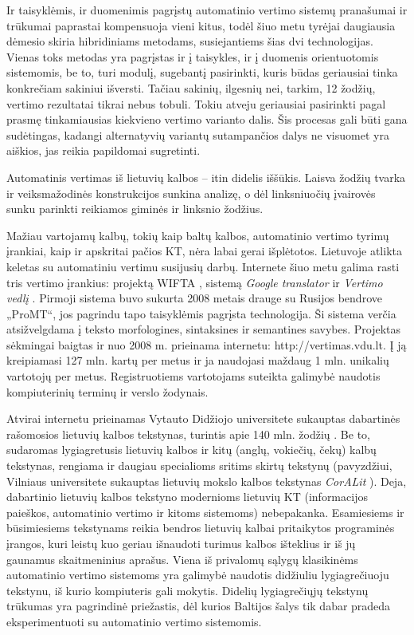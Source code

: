 \documentclass[]{../metanetpaper}
\begin{document}
\begin{multicols}{2}
Ir taisyklėmis, ir duomenimis pagrįstų automatinio vertimo sistemų pranašumai ir trūkumai paprastai kompensuoja vieni kitus, todėl šiuo metu tyrėjai daugiausia dėmesio skiria hibridiniams metodams, susiejantiems šias dvi technologijas. Vienas toks metodas yra pagrįstas ir į taisykles, ir į duomenis orientuotomis sistemomis, be to, turi modulį, sugebantį pasirinkti, kuris būdas geriausiai tinka konkrečiam sakiniui išversti. Tačiau sakinių, ilgesnių nei, tarkim, 12 žodžių, vertimo rezultatai tikrai nebus tobuli. Tokiu atveju geriausiai pasirinkti pagal prasmę tinkamiausias kiekvieno vertimo varianto dalis. Šis procesas gali būti gana sudėtingas, kadangi alternatyvių variantų sutampančios dalys ne visuomet yra aiškios, jas reikia papildomai sugretinti. 


Automatinis vertimas iš lietuvių kalbos – itin didelis iššūkis. Laisva žodžių tvarka ir veiksmažodinės konstrukcijos sunkina analizę, o dėl linksniuočių įvairovės sunku parinkti reikiamos giminės ir linksnio žodžius.   

    Mažiau vartojamų kalbų, tokių kaip baltų kalbos, automatinio vertimo tyrimų įrankiai, kaip ir apskritai pačios KT, nėra labai gerai išplėtotos. Lietuvoje atlikta keletas su automatiniu vertimu susijusių darbų. Internete šiuo metu galima rasti tris vertimo įrankius: projektą WIFTA \cite{vertvdu},  sistemą \textit{Google translator} ir \textit{Vertimo vedlį} \cite{mvlab}. Pirmoji sistema buvo sukurta 2008 metais drauge su Rusijos bendrove „ProMT“, jos pagrindu tapo taisyklėmis pagrįsta technologija. Ši sistema verčia atsižvelgdama į teksto morfologines, sintaksines ir semantines savybes. Projektas sėkmingai baigtas ir nuo 2008 m. prieinama internetu: http://vertimas.vdu.lt. Į ją kreipiamasi 127 mln. kartų per metus ir ja naudojasi maždaug 1 mln. unikalių vartotojų per metus. Registruotiems vartotojams suteikta galimybė naudotis kompiuterinių terminų ir verslo žodynais.

   Atvirai internetu prieinamas Vytauto Didžiojo universitete sukauptas dabartinės rašomosios lietuvių kalbos tekstynas, turintis apie 140 mln. žodžių \cite{tekstynas}.  Be to, sudaromas lygiagretusis lietuvių kalbos ir kitų (anglų, vokiečių, čekų) kalbų tekstynas, rengiama ir daugiau specialioms sritims skirtų tekstynų (pavyzdžiui, Vilniaus universitete sukauptas lietuvių mokslo kalbos tekstynas \textit{CorALit} \cite{coralit}). Deja, dabartinio lietuvių kalbos tekstyno modernioms lietuvių KT (informacijos paieškos, automatinio vertimo ir kitoms sistemoms) nebepakanka. Esamiesiems ir būsimiesiems tekstynams reikia bendros lietuvių kalbai pritaikytos programinės įrangos, kuri leistų kuo geriau išnaudoti turimus kalbos išteklius ir iš jų gaunamus skaitmeninius aprašus. Viena iš privalomų sąlygų klasikinėms automatinio vertimo sistemoms yra galimybė naudotis didžiuliu lygiagrečiuoju tekstynu, iš kurio kompiuteris gali mokytis. Didelių lygiagrečiųjų tekstynų trūkumas yra pagrindinė priežastis, dėl kurios Baltijos šalys tik dabar pradeda eksperimentuoti su automatinio vertimo sistemomis.   


\end{multicols}
\end{document}
